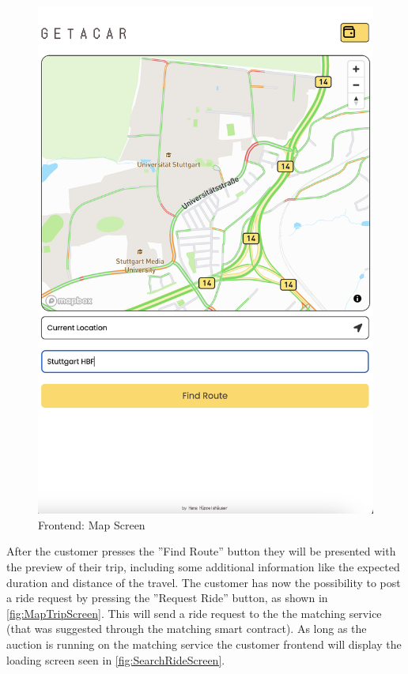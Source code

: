 \begin{figure}[H]
\begin{minipage}{0.45\linewidth}
        \includegraphics[width=\linewidth]{data/ffss/2.png}
        \caption{Frontend: Map Screen}
        \label{fig:MapScreen}
    \end{minipage}
    
\end{figure}

After the customer presses the ''Find Route'' button they will be presented with the preview of their trip, including some additional information like the expected duration and distance of the travel. The customer has now the possibility to post a ride request by pressing the ''Request Ride'' button, as shown in \ref{fig:MapTripScreen}.
This will send a ride request to the the matching service (that was suggested through the matching smart contract). As long as the auction is running on the matching service the customer frontend will display the loading screen seen in \ref{fig:SearchRideScreen}.


